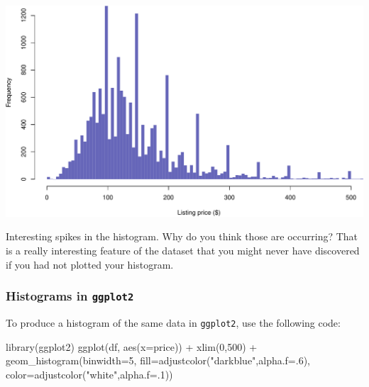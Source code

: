 \documentclass[
]{book}
\newenvironment{Shaded}{\begin{snugshade}}{\end{snugshade}}
\newcommand{\AttributeTok}[1]{\textcolor[rgb]{0.77,0.63,0.00}{#1}}
\newcommand{\DecValTok}[1]{\textcolor[rgb]{0.00,0.00,0.81}{#1}}
\newcommand{\FunctionTok}[1]{\textcolor[rgb]{0.00,0.00,0.00}{#1}}
\newcommand{\NormalTok}[1]{#1}
\newcommand{\SpecialCharTok}[1]{\textcolor[rgb]{0.00,0.00,0.00}{#1}}
\newcommand{\StringTok}[1]{\textcolor[rgb]{0.31,0.60,0.02}{#1}}
\begin{document}
\includegraphics{figures/unnamed-chunk-216-1.pdf}

Interesting spikes in the histogram. Why do you think those are occurring? That is a really interesting feature of the dataset that you might never have discovered if you had not plotted your histogram.

\hypertarget{histograms-in-ggplot2}{%
\subsubsection*{\texorpdfstring{Histograms in \texttt{ggplot2}}{Histograms in ggplot2}}\label{histograms-in-ggplot2}}

To produce a histogram of the same data in \texttt{ggplot2}, use the following code:

\begin{Shaded}
\begin{Highlighting}[]
\FunctionTok{library}\NormalTok{(ggplot2)}
\FunctionTok{ggplot}\NormalTok{(df, }\FunctionTok{aes}\NormalTok{(}\AttributeTok{x=}\NormalTok{price)) }\SpecialCharTok{+} 
  \FunctionTok{xlim}\NormalTok{(}\DecValTok{0}\NormalTok{,}\DecValTok{500}\NormalTok{) }\SpecialCharTok{+}
  \FunctionTok{geom\_histogram}\NormalTok{(}\AttributeTok{binwidth=}\DecValTok{5}\NormalTok{,}
                 \AttributeTok{fill=}\FunctionTok{adjustcolor}\NormalTok{(}\StringTok{"darkblue"}\NormalTok{,}\AttributeTok{alpha.f=}\NormalTok{.}\DecValTok{6}\NormalTok{),}
                 \AttributeTok{color=}\FunctionTok{adjustcolor}\NormalTok{(}\StringTok{"white"}\NormalTok{,}\AttributeTok{alpha.f=}\NormalTok{.}\DecValTok{1}\NormalTok{)) }
\end{Highlighting}
\end{Shaded}
\end{document}
